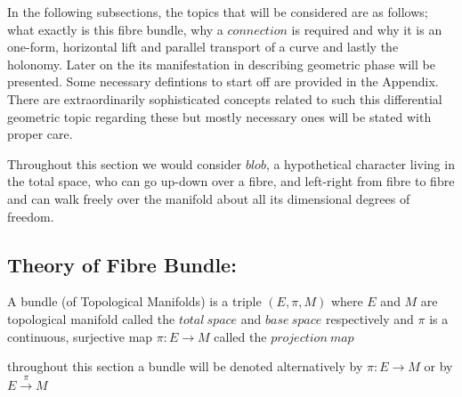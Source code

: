 \documentclass[8pt, twocoloumn]{article}
\begin{document}
In the following subsections, the topics that will be considered are as follows; what exactly is this fibre bundle, why a $connection$ is required and why it is an one-form, horizontal lift and parallel transport of a curve and lastly the holonomy. Later on the its manifestation in describing geometric phase will be presented. Some necessary defintions to start off are provided in the Appendix. There are extraordinarily sophisticated concepts related to such this differential geometric topic regarding these but mostly necessary ones will be stated with proper care.

Throughout this section we would consider $blob$, a hypothetical character living in the total space, who can go up-down over a fibre, and left-right from fibre to fibre and can walk freely over the manifold about all its dimensional degrees of freedom. 


\subsection{Theory of Fibre Bundle: }



\begin{theorem}
A bundle (of Topological Manifolds) is a triple $(E, \pi, M)$ where $E$ and $M$ are topological manifold called the $total \ space$ and $base \ space$ respectively and $\pi$ is a continuous, surjective map $\pi: E\to M$ called the $projection \ map$
\end{theorem}

throughout this section a bundle will be denoted alternatively by $\pi : E \to M$ or by $E \overset{\pi}{\to} M$
\end{document}
